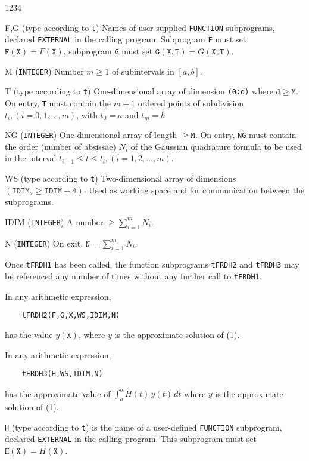 \begin{DLtt}{1234}
\item[F,G] (type according to {\tt t}) Names of user-supplied
{\tt FUNCTION} subprograms, declared {\tt EXTERNAL} in the calling
program.
Subprogram {\tt F} must set $\mathtt{F}(\mathtt{X})=F(\mathtt{X})$,
subprogram {\tt G} must set $\mathtt{G}(\mathtt{X,T})=G(\mathtt{X,T})$.
\item[M] ({\tt INTEGER}) Number $m \ge 1$  of subintervals in $[a,b]$.
\item[T] (type according to {\tt t}) One-dimensional array of
dimension {\tt (0:d)} where $\mathtt{d \ge M}$. On entry,
{\tt T} must contain the $m+1$ ordered points of subdivision
$t_i,(i=0,1,\ldots,m)$, with $t_0=a$ and $t_m=b$.
\item[NG] ({\tt INTEGER}) One-dimensional array of length
$\mathtt{\ge M}$. On entry, {\tt NG} must contain the order
(number of absissae) $N_i$ of the Gaussian quadrature formula to be used
in the interval $t_{i-1} \le t \le t_i, (i=1,2,\ldots,m)$.
\item[WS] (type according to {\tt t}) Two-dimensional array  of
dimensions $\mathtt{(IDIM,\ge IDIM+4)}$. Used as working space and for
communication between the subprograms.
\item[IDIM] ({\tt INTEGER}) A number $\ge \sum_{i=1}^m N_i$.
\item[N] ({\tt INTEGER}) On exit, $\mathtt{N} = \sum_{i=1}^m N_i$.
\end{DLtt}
\newpage
Once {\tt tFRDH1} has been called, the function subprograms
{\tt tFRDH2} and {\tt tFRDH3} may be referenced any number of times
without any further call to {\tt tFRDH1}.
\par
In any arithmetic expression,
\begin{verbatim}
    tFRDH2(F,G,X,WS,IDIM,N)
\end{verbatim}
has the value $y(\mathtt{X})$, where $y$ is the approximate solution of
(1).
\par
In any arithmetic expression,
\begin{verbatim}
    tFRDH3(H,WS,IDIM,N)
\end{verbatim}
has the approximate value of $\displaystyle \int_a^b H(t)\,y(t)\,dt$
where $y$ is the approximate solution of (1).
\par
{\tt H} (type according to {\tt t}) is the name of a user-defined
{\tt FUNCTION} subprogram, declared {\tt EXTERNAL} in the calling
program. This subprogram must set
$\mathtt{H}(\mathtt{X}) = H(\mathtt{X})$.
\par

